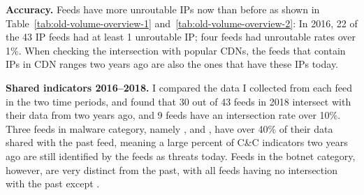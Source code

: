 \noindent\textbf{Accuracy.}
Feeds have more unroutable IPs now than before as shown in Table~\ref{tab:old-volume-overview-1} and~\ref{tab:old-volume-overview-2}:
In 2016, 22 of the 43 IP feeds had at least 1 unroutable IP; four feeds had unroutable rates over 1\%.
When checking the intersection with popular CDNs,
the feeds that contain IPs in CDN ranges two years ago are also the ones that have these IPs today.

\noindent\textbf{Shared indicators 2016--2018.}
I compared the data I collected from each feed in the two time periods, and found that 30
out of 43 feeds in 2018 intersect with their data from two years ago, and 9 feeds have
an intersection rate over 10\%. Three feeds in malware category, namely {\feedfeodo},
{\feedTSAbusech} and {\feedzeus}, have over 40\% of their data shared with the past feed,
meaning a large percent of C\&C indicators two years ago are still
identified by the feeds as threats today. Feeds in the botnet category, however, are very distinct from the
past, with all feeds having no intersection with the past except {\feedetiprep}.